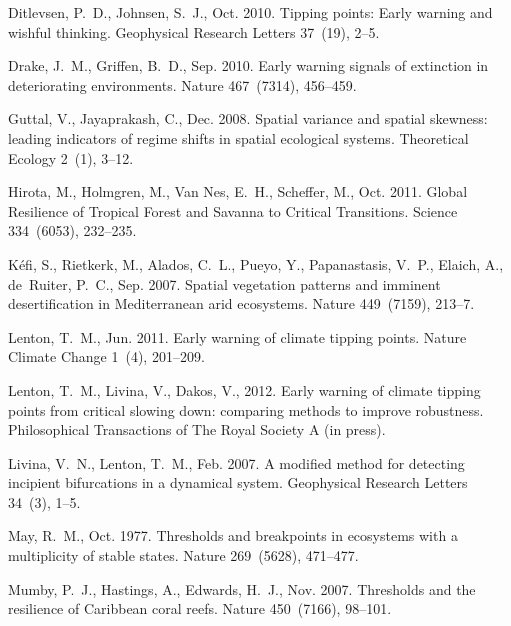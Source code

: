 \documentclass[authoryear,review,12pt]{elsarticle}
\begin{document}
\begin{thebibliography}{25}
Ditlevsen, P.~D., Johnsen, S.~J., Oct. 2010. {Tipping points: Early warning and
  wishful thinking}. Geophysical Research Letters 37~(19), 2--5.


Drake, J.~M., Griffen, B.~D., Sep. 2010. {Early warning signals of extinction
  in deteriorating environments}. Nature 467~(7314), 456--459.


Guttal, V., Jayaprakash, C., Dec. 2008. {Spatial variance and spatial skewness:
  leading indicators of regime shifts in spatial ecological systems}.
  Theoretical Ecology 2~(1), 3--12.


Hirota, M., Holmgren, M., {Van Nes}, E.~H., Scheffer, M., Oct. 2011. {Global
  Resilience of Tropical Forest and Savanna to Critical Transitions}. Science
  334~(6053), 232--235.


K\'{e}fi, S., Rietkerk, M., Alados, C.~L., Pueyo, Y., Papanastasis, V.~P.,
  Elaich, A., de~Ruiter, P.~C., Sep. 2007. {Spatial vegetation patterns and
  imminent desertification in Mediterranean arid ecosystems.} Nature
  449~(7159), 213--7.


Lenton, T.~M., Jun. 2011. {Early warning of climate tipping points}. Nature
  Climate Change 1~(4), 201--209.


Lenton, T.~M., Livina, V., Dakos, V., 2012. {Early warning of climate tipping
  points from critical slowing down: comparing methods to improve robustness}.
  Philosophical Transactions of The Royal Society A (in press).


Livina, V.~N., Lenton, T.~M., Feb. 2007. {A modified method for detecting
  incipient bifurcations in a dynamical system}. Geophysical Research Letters
  34~(3), 1--5.


May, R.~M., Oct. 1977. {Thresholds and breakpoints in ecosystems with a
  multiplicity of stable states}. Nature 269~(5628), 471--477.


Mumby, P.~J., Hastings, A., Edwards, H.~J., Nov. 2007. {Thresholds and the
  resilience of Caribbean coral reefs.} Nature 450~(7166), 98--101.



\end{thebibliography}
\end{document}
